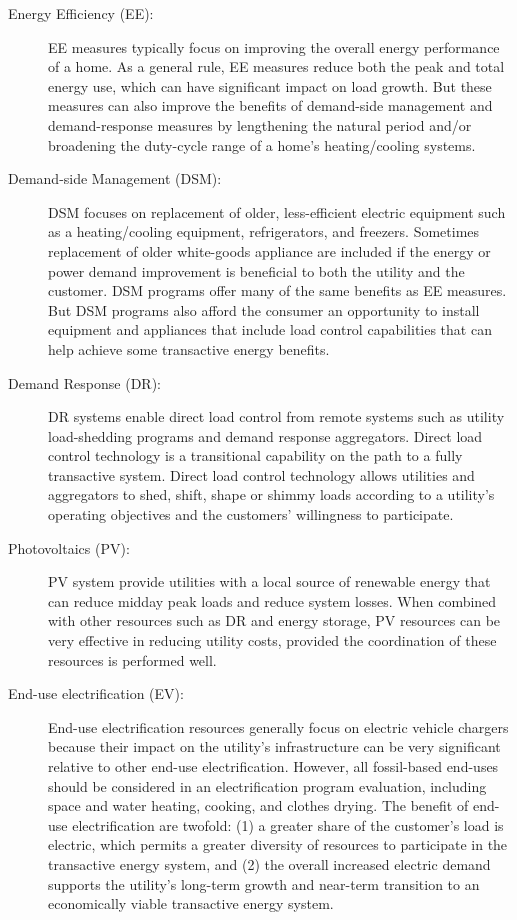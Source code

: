 \documentclass[10pt,twocolumn]{article}
\begin{document}
\begin{description}

    \item[Energy Efficiency (EE):] EE measures typically focus on improving the overall energy performance of a home.  As a general rule, EE measures reduce both the peak and total energy use, which can have significant impact on load growth. But these measures can also improve the benefits of demand-side management and demand-response measures by lengthening the natural period and/or broadening the duty-cycle range of a home's heating/cooling systems. 

    \item[Demand-side Management (DSM):] DSM focuses on replacement of older, less-efficient electric equipment such as a heating/cooling equipment, refrigerators, and freezers.  Sometimes replacement of older white-goods appliance are included if the energy or power demand improvement is beneficial to both the utility and the customer. DSM programs offer many of the same benefits as EE measures. But DSM programs also afford the consumer an opportunity to install equipment and appliances that include load control capabilities that can help achieve some transactive energy benefits.

    \item[Demand Response (DR):] DR systems enable direct load control from remote systems such as utility load-shedding programs and demand response aggregators.  Direct load control technology is a transitional capability on the path to a fully transactive system.  Direct load control technology allows utilities and aggregators to shed, shift, shape or shimmy loads according to a utility's operating objectives and the customers' willingness to participate.

    \item[Photovoltaics (PV):] PV system provide utilities with a local source of renewable energy that can reduce midday peak loads and reduce system losses.  When combined with other resources such as DR and energy storage, PV resources can be very effective in reducing utility costs, provided the coordination of these resources is performed well.

    \item[End-use electrification (EV):] End-use electrification resources generally focus on electric vehicle chargers because their impact on the utility's infrastructure can be very significant relative to other end-use electrification.  However, all fossil-based end-uses should be considered in an electrification program evaluation, including space and water heating, cooking, and clothes drying. The benefit of end-use electrification are twofold: (1) a greater share of the customer's load is electric, which permits a greater diversity of resources to participate in the transactive energy system, and (2) the overall increased electric demand supports the utility's long-term growth and near-term transition to an economically viable transactive energy system.


\end{description}
\end{document}
